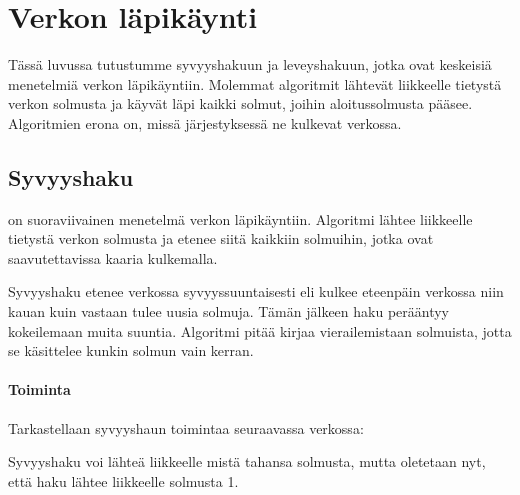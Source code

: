 \chapter{Verkon läpikäynti}

Tässä luvussa tutustumme
syvyyshakuun ja leveyshakuun, jotka
ovat keskeisiä menetelmiä verkon läpikäyntiin.
Molemmat algoritmit lähtevät liikkeelle
tietystä verkon solmusta ja 
käyvät läpi kaikki solmut,
joihin aloitussolmusta pääsee.
Algoritmien erona on,
missä järjestyksessä ne kulkevat verkossa.

\section{Syvyyshaku}


on suoraviivainen menetelmä verkon läpikäyntiin.
Algoritmi lähtee liikkeelle tietystä
verkon solmusta ja etenee siitä
kaikkiin solmuihin, jotka ovat
saavutettavissa kaaria kulkemalla.

Syvyyshaku etenee verkossa syvyyssuuntaisesti
eli kulkee eteenpäin verkossa niin kauan
kuin vastaan tulee uusia solmuja.
Tämän jälkeen haku perääntyy kokeilemaan
muita suuntia.
Algoritmi pitää kirjaa vierailemistaan solmuista,
jotta se käsittelee kunkin solmun vain kerran.

\subsubsection*{Toiminta}

Tarkastellaan syvyyshaun toimintaa
seuraavassa verkossa:
\begin{center}
\end{center}
Syvyyshaku voi lähteä liikkeelle
mistä tahansa solmusta,
mutta oletetaan nyt,
että haku lähtee liikkeelle solmusta 1.

